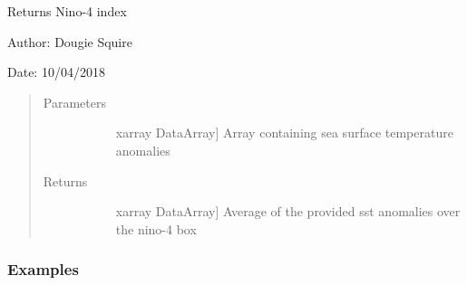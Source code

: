 \documentclass[letterpaper,10pt,english]{sphinxmanual}
\begin{document}

\begin{fulllineitems}
\label{\detokenize{diagnostic_doc:diagnostic.nino4}}
Returns Nino-4 index

\begin{DUlineblock}{0em}
\item[] Author: Dougie Squire
\item[] Date: 10/04/2018
\end{DUlineblock}
\begin{quote}\begin{description}
\item[{Parameters}] \leavevmode\begin{description}
\item[{}] \leavevmode{[}xarray DataArray{]}
Array containing sea surface temperature anomalies

\end{description}

\item[{Returns}] \leavevmode\begin{description}
\item[{}] \leavevmode{[}xarray DataArray{]}
Average of the provided sst anomalies over the nino-4 box

\end{description}

\end{description}\end{quote}
\subsubsection*{Examples}


\end{fulllineitems}
\end{document}
